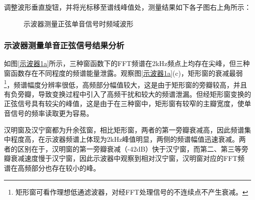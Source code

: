 \documentclass[12pt]{article}
\begin{document}
调整波形垂直旋钮，并将光标移至谱线峰值处，测量结果如下各子图右上角所示：
\begin{figure}[H]
    \centering
    
     \hspace{0.005\linewidth}
         \hspace{0.005\linewidth}
    \caption{示波器测量正弦单音信号时频域波形}
  \label{示波器1a(2)}
\end{figure}

\subsubsection{示波器测量单音正弦信号结果分析}
如图\ref{示波器1a}所示，三种窗函数下的FFT频谱在2kHz频点上均存在尖峰，但三种窗函数存在不同程度的频谱能量泄露。观察图\ref{示波器1a}(c)，矩形窗的衰减最弱\footnote{矩形窗可看作理想低通滤波器，对经FFT处理信号的不连续点不产生衰减。}，频谱幅度分辨率很低，高频部分幅值较大，这是由于矩形窗的旁瓣较高，并且有负旁瓣，导致变换过程中引入了高频干扰和较大的频谱泄漏。但经矩形窗变换的正弦信号具有较尖的峰值，这是由于在三种窗中，矩形窗有较窄的主瓣宽度，使单音信号的频率读取更为容易。

汉明窗及汉宁窗都为升余弦窗，相比矩形窗，两者的第一旁瓣衰减高，因此频谱集中程度高，在示波器频谱上体现为2kHz峰值明显，两侧的频谱幅值迅速衰减。两者的区别在于，汉明窗的第一旁瓣衰减（-42dB）快于汉宁窗，而第二、第三等旁瓣衰减速度慢于汉宁窗，因此示波器中观察到相对汉宁窗，汉明窗对应的FFT频谱在高频部分也存在较小的峰。
\end{document}
